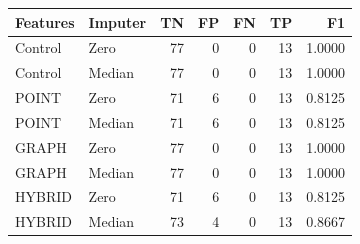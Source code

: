 \centering\footnotesize
\begin{tabular}{@{}llrrrrr@{}}
\toprule
Features & Imputer & TN & FP & FN & TP & F1\\\midrule
Control & Zero & 77 & 0 & 0 & 13 & 1.0000\\
Control & Median & 77 & 0 & 0 & 13 & 1.0000\\
POINT & Zero & 71 & 6 & 0 & 13 & 0.8125\\
POINT & Median & 71 & 6 & 0 & 13 & 0.8125\\
GRAPH & Zero & 77 & 0 & 0 & 13 & 1.0000\\
GRAPH & Median & 77 & 0 & 0 & 13 & 1.0000\\
HYBRID & Zero & 71 & 6 & 0 & 13 & 0.8125\\
HYBRID & Median & 73 & 4 & 0 & 13 & 0.8667\\
\bottomrule
\end{tabular}
